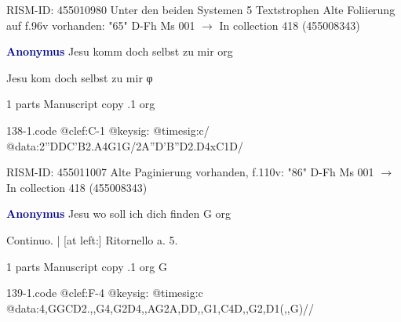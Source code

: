 \documentclass[twocolumn]{book}
\begin{document}
\newline RISM-ID: 455010980
\newline Unter den beiden Systemen 5 Textstrophen
\newline Alte Foliierung auf f.96v vorhanden: "65"
\newline D-Fh  Ms 001
\newline $\rightarrow$ In collection 418 (455008343)

\newline \par \vspace{7pt} \textcolor{darkblue}{\textbf{Anonymus  }}
\newline Jesu komm doch selbst zu mir    
\newline org
\newline \begin{itshape} Jesu kom doch selbst zu mir φ\end{itshape} 
\newline \textcolor{darkblue}{}  1 parts  
\newline Manuscript copy
.1  org  
\begin{filecontents*}{138-1.code}
@clef:C-1
@keysig:
@timesig:c/
@data:2''DDC'B2.A4G1G/2A''D'B''D2.D4xC1D/
\end{filecontents*}
\newline
%

\newline RISM-ID: 455011007
\newline Alte Paginierung vorhanden, f.110v: "86"
\newline D-Fh  Ms 001
\newline $\rightarrow$ In collection 418 (455008343)

\newline \par \vspace{7pt} \textcolor{darkblue}{\textbf{Anonymus  }}
\newline Jesu wo soll ich dich finden  G  
\newline org
\newline \begin{itshape}[f.55v, heading:] Continuo. | [at left:] Ritornello a. 5.\end{itshape} 
\newline \textcolor{darkblue}{}  1 parts  
\newline Manuscript copy
.1  org  G  
\begin{filecontents*}{139-1.code}
@clef:F-4
@keysig:
@timesig:c
@data:4,GGCD2.,,G4,G2D4,,AG2A,DD,,G1,C4D,,G2,D1(,,G)//
\end{filecontents*}
\newline
%
\end{document}
